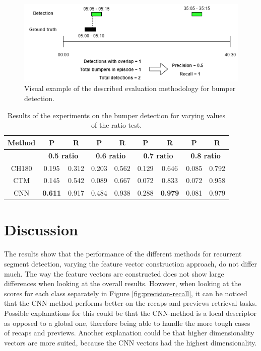 \documentclass{report}
\begin{document}
\begin{figure}[H]
	\includegraphics[width=\textwidth]{images/evaluation-bumpers.png}
	\centering
	\caption{Visual example of the described evaluation methodology for bumper detection.}
	\label{fig:evaluation-example-bumpers}
\end{figure}

\begin{table}[H]
	\begin{center}
		\begin{tabular}{ c c c c c c c c c} 
			\hline
			\textbf{Method} & \textbf{P} & \textbf{R} & \textbf{P} & \textbf{R} & \textbf{P} & \textbf{R} & \textbf{P} & \textbf{R} \\
			\hline
			& \multicolumn{2}{c}{\textbf{0.5 ratio}} & \multicolumn{2}{c}{\textbf{0.6 ratio}} & \multicolumn{2}{c}{\textbf{0.7 ratio}} & \multicolumn{2}{c}{\textbf{0.8 ratio}} \\
			\hline
			CH180 			& 0.195				& 0.312 		& 0.203		& 0.562		& 0.129		& 0.646 	& 0.085 	& 0.792 \\
			CTM 			&  0.145			& 0.542 		& 0.089		& 0.667 	& 0.072		& 0.833 	& 0.072 	& 0.958 \\
			CNN 			& \textbf{0.611}	& 0.917			& 0.484		& 0.938 	& 0.288		& \textbf{0.979} 	& 0.081 	& 0.979 \\
			\hline
		\end{tabular}
	\end{center}
	\caption{Results of the experiments on the bumper detection for varying values of the ratio test.}
	\label{table:resultsbumpers}
\end{table}

\section{Discussion} \label{discussion}
The results show that the performance of the different methods for recurrent segment detection, varying the feature vector construction approach, do not differ much. The way the feature vectors are constructed does not show large differences when looking at the overall results. However, when looking at the scores for each class separately in Figure \ref{fig:precision-recall}, it can be noticed that the CNN-method performs better on the recaps and previews retrieval tasks. Possible explanations for this could be that the CNN-method is a local descriptor as opposed to a global one, therefore being able to handle the more tough cases of recaps and previews. Another explanation could be that higher dimensionality vectors are more suited, because the CNN vectors had the highest dimensionality.
\end{document}
